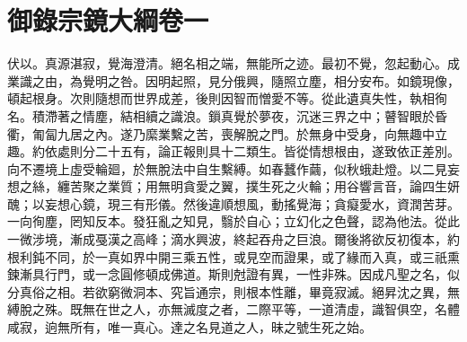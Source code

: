 
\clearpage
\section{御錄宗鏡大綱卷一}

伏以。真源湛寂，覺海澄清。絕名相之端，無能所之迹。最初不覺，忽起動心。成業識之由，為覺明之咎。因明起照，見分俄興，隨照立塵，相分安布。如鏡現像，頓起根身。次則隨想而世界成差，後則因智而憎愛不等。從此遺真失性，執相徇名。積滯著之情塵，結相續之識浪。鎻真覺於夢夜，沉迷三界之中；瞽智眼於昏衢，匍匐九居之內。遂乃縻業繫之苦，喪解脫之門。於無身中受身，向無趣中立趣。約依處則分二十五有，論正報則具十二類生。皆從情想根由，遂致依正差別。向不遷境上虛受輪廻，於無脫法中自生繫縛。如春蠶作繭，似秋蛾赴燈。以二見妄想之絲，纏苦聚之業質；用無明貪愛之翼，撲生死之火輪；用谷響言音，論四生妍醜；以妄想心鏡，現三有形儀。然後違順想風，動搖覺海；貪癡愛水，資潤苦芽。一向徇塵，罔知反本。發狂亂之知見，翳於自心；立幻化之色聲，認為他法。從此一微涉境，漸成戞漢之高峰；滴水興波，終起吞舟之巨浪。爾後將欲反初復本，約根利鈍不同，於一真如界中開三乘五性，或見空而證果，或了緣而入真，或三祇熏鍊漸具行門，或一念圓修頓成佛道。斯則尅證有異，一性非殊。因成凡聖之名，似分真俗之相。若欲窮微洞本、究旨通宗，則根本性離，畢竟寂滅。絕昇沈之異，無縛脫之殊。既無在世之人，亦無滅度之者，二際平等，一道清虛，識智俱空，名體咸寂，逈無所有，唯一真心。達之名見道之人，昧之號生死之始。


